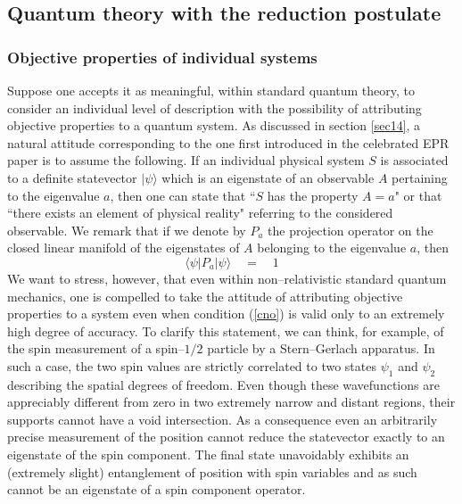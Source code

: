 \documentclass[10pt,a4paper]{article}
\begin{document}
\subsection{Quantum theory with the reduction postulate}
\label{sec101}

\subsubsection{Objective properties of individual systems}
\label{sec1011}

Suppose one accepts it as meaningful, within standard quantum
theory, to consider an individual level of description with the
possibility of attributing objective properties to a quantum
system. As discussed in section \ref{sec14}, a natural attitude
corresponding to the one first introduced in the celebrated EPR
paper \cite{epr} is to assume the following. If an individual
physical system $S$ is associated to a definite statevector
$|\psi\rangle$ which is an eigenstate of an observable $A$
pertaining to the eigenvalue $a$, then one can state that ``$S$
has the property $A=a$" or that ``there exists an element of
physical reality" referring  to the considered observable. We
remark that if we denote by $P_{a}$ the projection operator on the
closed linear manifold of the eigenstates of $A$ belonging to the
eigenvalue $a$, then
\begin{equation} \label{cno}
\langle\psi | P_{a} |\psi\rangle \quad = \quad 1
\end{equation}
We want to stress, however, that even within non--relativistic
standard quantum mechanics, one is compelled to take the attitude
of attributing objective properties to a system even when
condition (\ref{cno}) is valid only to an extremely high degree of
accuracy. To clarify this statement, we can think, for example, of
the spin measurement of a spin--$1/2$ particle by a Stern--Gerlach
apparatus. In such a case, the two spin values are strictly
correlated to two states $\psi_{1}$ and $\psi_{2}$ describing the
spatial degrees of freedom. Even though these wavefunctions are
appreciably different from zero in two extremely narrow and
distant regions, their supports cannot have a void intersection.
As a consequence even an arbitrarily precise measurement of the
position cannot reduce the statevector exactly to an eigenstate of
the spin component. The final state unavoidably exhibits an
(extremely slight) entanglement of position with spin variables
and as such cannot be an eigenstate of a spin component operator.
\end{document}
